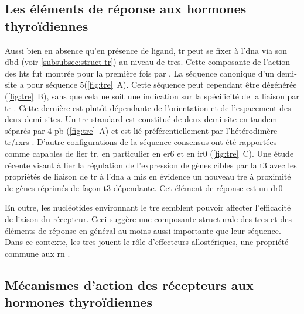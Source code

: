 \documentclass[../main.tex]{subfiles}
\begin{document}



\subsection{Les éléments de réponse aux hormones thyroïdiennes}
Aussi bien en absence qu'en présence de ligand, \gls{tr} peut se fixer à l'\gls{dna} via son \gls{dbd} (voir \autoref{subsubsec:struct-tr}) au niveau de \glspl{tre}.
Cette composante de l'action des \glspl{ht} fut montrée pour la première fois par \citet{Wight1987}.
La séquence canonique d'un demi-site a pour séquence 5\prime (\autoref{fig:tre}~A).
Cette séquence peut cependant être dégénérée (\autoref{fig:tre}~B), sans que cela ne soit une indication sur la spécificité de la liaison par \gls{tr} \citep{Chatonnet2013}.
Cette dernière est plutôt dépendante de l'orientation et de l'espacement des deux demi-sites.
Un \gls{tre} standard est constitué de deux demi-site en tandem séparés par 4 \gls{pb} (\autoref{fig:tre}~A) et est lié préférentiellement par l'hétérodimère \gls{tr}/\glspl{rxr} \citep{Wahlstrom1992}.
D'autre configurations de la séquence consensus ont été rapportées comme capables de lier \gls{tr}, en particulier en \gls{er6} et en \gls{ir0} (\autoref{fig:tre}~C).
Une étude récente visant à lier la régulation de l'expression de gènes cibles par la \gls{t3} avec les propriétés de liaison de \gls{tr} à l'\gls{dna} a mis en évidence un nouveau \gls{tre} à proximité de gènes réprimés de façon \gls{t3}-dépendante.
Cet élément de réponse est un \gls{dr0} \citep{Ramadoss2014}



En outre, les nucléotides environnant le \gls{tre} semblent pouvoir affecter l'efficacité de liaison du récepteur.
Ceci suggère une composante structurale des \glspl{tre} et des éléments de réponse en général au moins aussi importante que leur séquence.
Dans ce contexte, les \glspl{tre} jouent le rôle d'effecteurs allostériques, une propriété commune aux \gls{rn} \citep{Hall2002,Billas2013}.


\subsection{Mécanismes d'action des récepteurs aux hormones thyroïdiennes}
\end{document}
